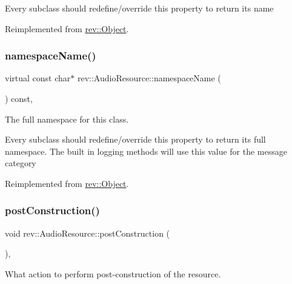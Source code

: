 Every subclass should redefine/override this property to return its name 

Reimplemented from \mbox{\hyperlink{classrev_1_1_object_a7a2013f91169479b65cf93afdc5d9a68}{rev\+::\+Object}}.

\mbox{\label{classrev_1_1_audio_resource_a56de5461f5fa79c4af7c6ff2d3fdfeed}} 
\subsubsection{\texorpdfstring{namespaceName()}{namespaceName()}}
{\footnotesize\ttfamily virtual const char$\ast$ rev\+::\+Audio\+Resource\+::namespace\+Name (\begin{DoxyParamCaption}{ }\end{DoxyParamCaption}) const\hspace{0.3cm}{\ttfamily [inline]}, {\ttfamily [virtual]}}



The full namespace for this class. 

Every subclass should redefine/override this property to return its full namespace. The built in logging methods will use this value for the message category 

Reimplemented from \mbox{\hyperlink{classrev_1_1_object_aaeb638d3e10f361c56c211a318a27f3d}{rev\+::\+Object}}.

\mbox{\label{classrev_1_1_audio_resource_a485cda6016a1dc52310239fb6c58e8cd}} 
\subsubsection{\texorpdfstring{postConstruction()}{postConstruction()}}
{\footnotesize\ttfamily void rev\+::\+Audio\+Resource\+::post\+Construction (\begin{DoxyParamCaption}{ }\end{DoxyParamCaption})\hspace{0.3cm}{\ttfamily [override]}, {\ttfamily [virtual]}}



What action to perform post-\/construction of the resource. 

